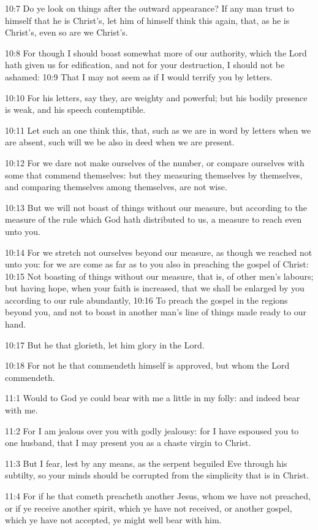 10:7 Do ye look on things after the outward appearance? If any man
trust to himself that he is Christ's, let him of himself think this
again, that, as he is Christ's, even so are we Christ's.

10:8 For though I should boast somewhat more of our authority, which
the Lord hath given us for edification, and not for your destruction,
I should not be ashamed: 10:9 That I may not seem as if I would
terrify you by letters.

10:10 For his letters, say they, are weighty and powerful; but his
bodily presence is weak, and his speech contemptible.

10:11 Let such an one think this, that, such as we are in word by
letters when we are absent, such will we be also in deed when we are
present.

10:12 For we dare not make ourselves of the number, or compare
ourselves with some that commend themselves: but they measuring
themselves by themselves, and comparing themselves among themselves,
are not wise.

10:13 But we will not boast of things without our measure, but
according to the measure of the rule which God hath distributed to us,
a measure to reach even unto you.

10:14 For we stretch not ourselves beyond our measure, as though we
reached not unto you: for we are come as far as to you also in
preaching the gospel of Christ: 10:15 Not boasting of things without
our measure, that is, of other men's labours; but having hope, when
your faith is increased, that we shall be enlarged by you according to
our rule abundantly, 10:16 To preach the gospel in the regions beyond
you, and not to boast in another man's line of things made ready to
our hand.

10:17 But he that glorieth, let him glory in the Lord.

10:18 For not he that commendeth himself is approved, but whom the
Lord commendeth.

11:1 Would to God ye could bear with me a little in my folly: and
indeed bear with me.

11:2 For I am jealous over you with godly jealousy: for I have
espoused you to one husband, that I may present you as a chaste virgin
to Christ.

11:3 But I fear, lest by any means, as the serpent beguiled Eve
through his subtilty, so your minds should be corrupted from the
simplicity that is in Christ.

11:4 For if he that cometh preacheth another Jesus, whom we have not
preached, or if ye receive another spirit, which ye have not received,
or another gospel, which ye have not accepted, ye might well bear with
him.

